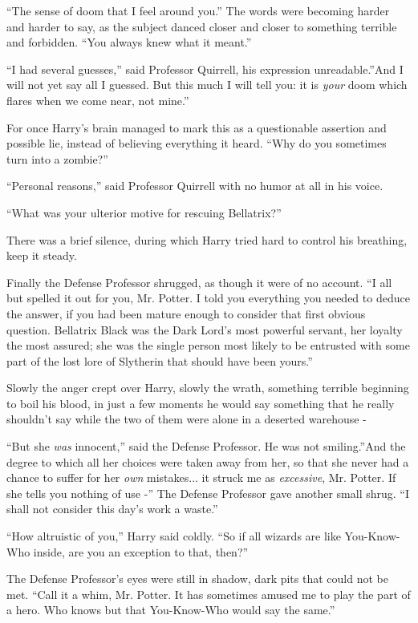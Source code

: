 ``The sense of doom that I feel around you.'' The words were becoming
harder and harder to say, as the subject danced closer and closer to
something terrible and forbidden. ``You always knew what it meant.''

``I had several guesses,'' said Professor Quirrell, his expression
unreadable.''And I will not yet say all I guessed. But this much I will
tell you: it is \emph{your} doom which flares when we come near, not
mine.''

For once Harry's brain managed to mark this as a questionable assertion
and possible lie, instead of believing everything it heard. ``Why do you
sometimes turn into a zombie?''

``Personal reasons,'' said Professor Quirrell with no humor at all in
his voice.

``What was your ulterior motive for rescuing Bellatrix?''

There was a brief silence, during which Harry tried hard to control his
breathing, keep it steady.

Finally the Defense Professor shrugged, as though it were of no account.
``I all but spelled it out for you, Mr. Potter. I told you everything
you needed to deduce the answer, if you had been mature enough to
consider that first obvious question. Bellatrix Black was the Dark
Lord's most powerful servant, her loyalty the most assured; she was the
single person most likely to be entrusted with some part of the lost
lore of Slytherin that should have been yours.''

Slowly the anger crept over Harry, slowly the wrath, something terrible
beginning to boil his blood, in just a few moments he would say
something that he really shouldn't say while the two of them were alone
in a deserted warehouse -

``But she \emph{was} innocent,'' said the Defense Professor. He was not
smiling.''And the degree to which all her choices were taken away from
her, so that she never had a chance to suffer for her \emph{own}
mistakes... it struck me as \emph{excessive}, Mr. Potter. If she
tells you nothing of use -'' The Defense Professor gave another small
shrug. ``I shall not consider this day's work a waste.''

``How altruistic of you,'' Harry said coldly. ``So if all wizards are
like You-Know-Who inside, are you an exception to that, then?''

The Defense Professor's eyes were still in shadow, dark pits that could
not be met. ``Call it a whim, Mr. Potter. It has sometimes amused me to
play the part of a hero. Who knows but that You-Know-Who would say the
same.''

